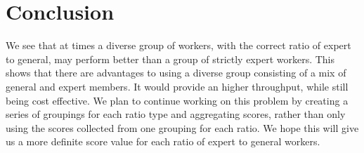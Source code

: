 \documentclass{chi2012}
\newcommand{\tab}{\hspace*{2em}}
\begin{document}
\section{Conclusion}

\tab We see that at times a diverse group of workers, with the correct ratio of expert to general, may perform better than a group of strictly expert workers. This shows that there are advantages to using a diverse group consisting of a mix of general and expert members. It would provide an higher throughput, while still being cost effective. We plan to continue working on this problem by creating a series of groupings for each ratio type and aggregating scores, rather than only using the scores collected from one grouping for each ratio. We hope this will give us a more definite score value for each ratio of expert to general workers. 

\balancecolumns %



\end{document}
